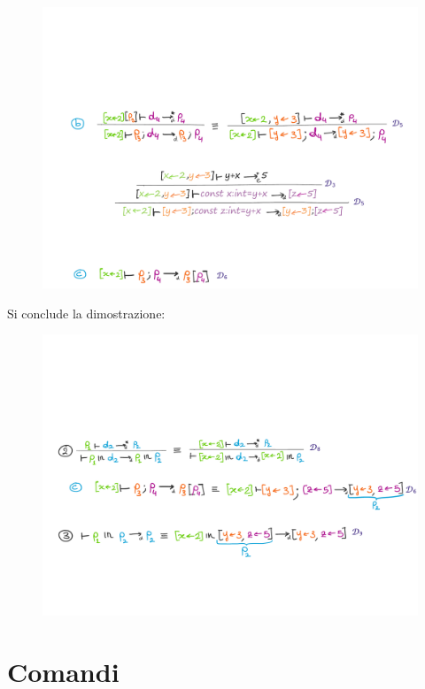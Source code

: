 \documentclass[a4paper]{article}
\begin{document}
	\begin{figure}[!htp]
		\centering
		\includegraphics[width=\textwidth]{img/regola_espressione-ex6.pdf}
	\end{figure}

	\noindent
	Si conclude la dimostrazione:
	
	\begin{figure}[!htp]
		\centering
		\includegraphics[width=\textwidth]{img/regola_espressione-ex7.pdf}
	\end{figure}\newpage

	\section{Comandi}
	
\end{document}
